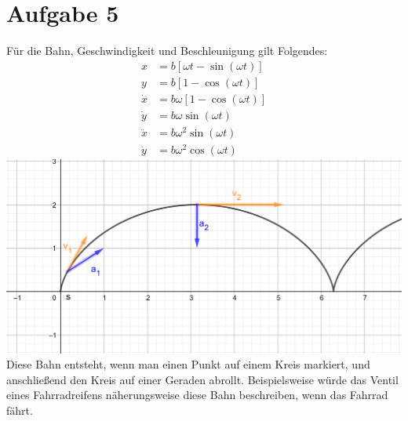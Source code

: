 \documentclass[a4paper,10pt]{extarticle}
\begin{document}
\section*{Aufgabe 5}
Für die Bahn, Geschwindigkeit und Beschleunigung gilt Folgendes:
\begin{align*}
  x        &= b[\omega t - \sin(\omega t)]\\
  y        &= b[1 - \cos(\omega t)]\\
  \dot{x}  &= b\omega[1 - \cos(\omega t)]\\
  \dot{y}  &= b\omega\sin(\omega t)\\
  \ddot{x} &= b\omega^2\sin(\omega t)\\
  \ddot{y} &= b\omega^2\cos(\omega t)
\end{align*}
\includegraphics[scale=0.75]{./geogebra-export.png}\\
Diese Bahn entsteht, wenn man einen Punkt auf einem Kreis markiert, und anschließend den Kreis auf einer Geraden abrollt. Beispielsweise würde das Ventil eines Fahrradreifens näherungsweise diese Bahn beschreiben, wenn das Fahrrad fährt.
\end{document}
